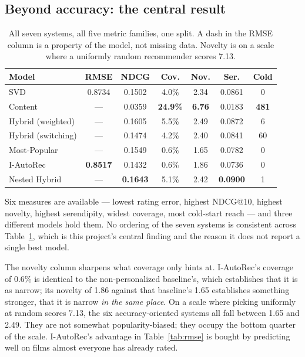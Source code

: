 \documentclass[10pt,twocolumn,letterpaper]{article}
\begin{document}
\subsection{Beyond accuracy: the central result}\label{sec:beyond}
\begin{table}[t]\centering\footnotesize
\begin{tabular}{lcccccc}
\toprule
Model & RMSE & NDCG & Cov. & Nov. & Ser. & Cold \\
\midrule
SVD                & 0.8734 & 0.1502 & 4.0\%  & 2.34 & 0.0861 & 0 \\
Content            & ---    & 0.0359 & \textbf{24.9\%} & \textbf{6.76} & 0.0183 & \textbf{481} \\
Hybrid (weighted)  & ---    & 0.1605 & 5.5\%  & 2.49 & 0.0872 & 6 \\
Hybrid (switching) & ---    & 0.1474 & 4.2\%  & 2.40 & 0.0841 & 60 \\
Most-Popular       & ---    & 0.1549 & 0.6\%  & 1.65 & 0.0782 & 0 \\
I-AutoRec          & \textbf{0.8517} & 0.1432 & 0.6\% & 1.86 & 0.0736 & 0 \\
Nested Hybrid      & ---    & \textbf{0.1643} & 5.1\% & 2.42 & \textbf{0.0900} & 1 \\
\bottomrule
\end{tabular}
\caption{All seven systems, all five metric families, one split. A dash in the
RMSE column is a property of the model, not missing data. Novelty is on a
scale where a uniformly random recommender scores 7.13.}
\label{tab:all}
\end{table}

Six measures are available --- lowest rating error, highest NDCG@10, highest
novelty, highest serendipity, widest coverage, most cold-start reach --- and
three different models hold them. No ordering of the seven systems is
consistent across Table~\ref{tab:all}, which is this project's central finding
and the reason it does not report a single best model.

The novelty column sharpens what coverage only hints at. I-AutoRec's coverage
of 0.6\% is identical to the non-personalized baseline's, which establishes
that it is as narrow; its novelty of 1.86 against that baseline's 1.65
establishes something stronger, that it is narrow \emph{in the same place}. On
a scale where picking uniformly at random scores 7.13, the six
accuracy-oriented systems all fall between 1.65 and 2.49. They are not
somewhat popularity-biased; they occupy the bottom quarter of the scale.
I-AutoRec's advantage in Table~\ref{tab:rmse} is bought by predicting well on
films almost everyone has already rated.
\end{document}
